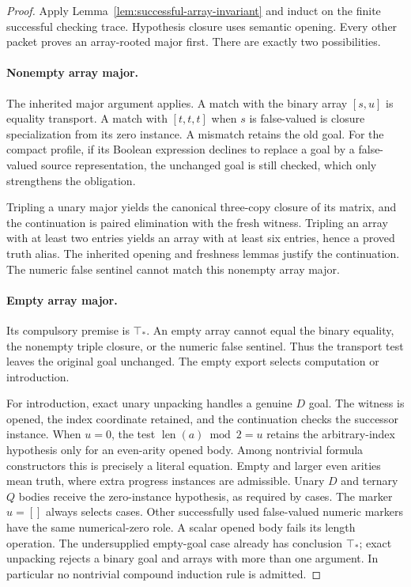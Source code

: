 \documentclass[11pt,letterpaper]{article}
\theoremstyle{definition}\newtheorem{definition}[theorem]{Definition}
\theoremstyle{remark}\newtheorem{remark}[theorem]{Remark}
\begin{document}
\begin{proof}
Apply Lemma~\ref{lem:successful-array-invariant} and induct on the
finite successful checking trace.  Hypothesis closure uses semantic
opening.  Every other packet proves an array-rooted major first.
There are exactly two possibilities.

\paragraph{Nonempty array major.}
The inherited major argument applies.  A match with the binary array
$[s,u]$ is equality transport.  A match with $[t,t,t]$ when $s$ is
false-valued is closure specialization from its zero instance.  A
mismatch retains the old goal. For the compact profile, if its Boolean
expression declines to
replace a goal by a false-valued source representation, the unchanged
goal is still checked, which only strengthens the obligation.

Tripling a unary major yields the canonical three-copy closure of its
matrix, and the continuation is paired elimination with the fresh witness.
Tripling an array with at least two entries yields an array with at least
six entries, hence a proved truth alias.  The inherited opening and
freshness lemmas justify the continuation.  The numeric false sentinel
cannot match this nonempty array major.

\paragraph{Empty array major.}
Its compulsory premise is $\top_*$.  An empty array cannot equal the
binary equality, the nonempty triple closure, or the numeric false
sentinel.  Thus the transport test leaves the original goal unchanged.
The empty export selects computation or introduction.

For introduction, exact unary unpacking handles a genuine $D$ goal.
The witness is opened, the index coordinate retained, and the continuation
checks the successor instance.  When $u=0$, the test
$\operatorname{len}(a)\bmod2=u$ retains the arbitrary-index hypothesis
only for an even-arity opened body.  Among nontrivial formula constructors
this is precisely a literal equation.  Empty and larger even arities mean
truth, where extra progress instances are admissible.  Unary $D$ and
ternary $Q$ bodies receive the zero-instance hypothesis, as required by
cases.  The marker $u=[]$ always selects cases.  Other successfully used
false-valued numeric markers have the same numerical-zero role.  A scalar
opened body fails its length operation.  The undersupplied empty-goal case
already has conclusion $\top_*$; exact unpacking rejects a binary goal
and arrays with more than one argument.  In particular no nontrivial
compound induction rule is admitted.


\end{proof}
\end{document}
